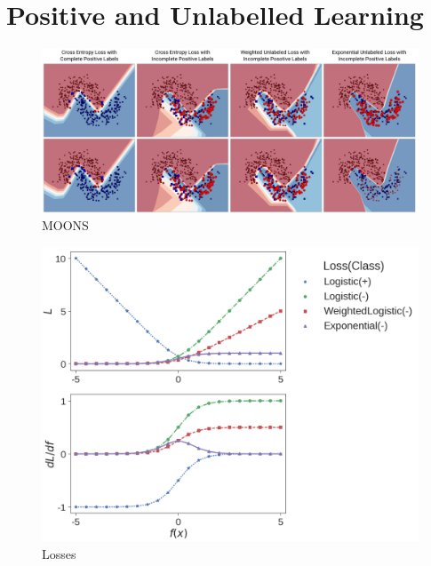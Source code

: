 \section{Positive and Unlabelled Learning}
\label{pulearning}


\begin{figure}
\begin{center}
   \includegraphics[width=0.95\linewidth]{img/moons.png}
\end{center}
   \caption{MOONS}
\label{fig:moons}
\end{figure}


\begin{figure}[t]
\begin{center}
   \includegraphics[width=0.95\linewidth]{img/losses.png}
\end{center}
   \caption{Losses}
\label{fig:losses}
\end{figure}


